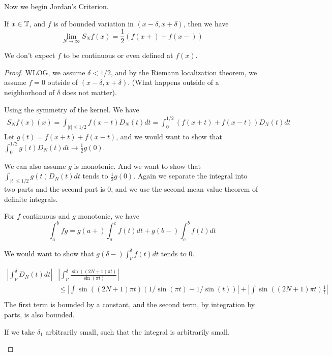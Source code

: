 Now we begin Jordan's Criterion.
\begin{theorem}
    If $x\in\mathbb{T}$, and $f$ is of bounded variation in $(x-\delta, x+\delta)$, then we have
    \begin{equation*}
        \lim_{N\to\infty}S_Nf(x)=\frac{1}{2}(f(x+)+f(x-))
    \end{equation*}
\end{theorem}
\begin{remark}
    We don't expect $f$ to be continuous or even defined at $f(x)$.
\end{remark}
\begin{proof}
    WLOG, we assume $\delta<1/2$, and by the Riemann localization theorem, we assume $f=0$ outside of $(x-\delta, x+\delta)$. (What happens outside of a neighborhood of $\delta$ does not matter).

    Using the symmetry of the kernel. We have
    \begin{align*}
        S_Nf(x)(x)=\int_{|t|\leq1/2}f(x-t)D_N(t)dt=\int_0^{1/2}(f(x+t)+f(x-t))D_N(t)dt
    \end{align*}
    Let $g(t)=f(x+t)+f(x-t)$, and we would want to show that $\int_0^{1/2}g(t)D_N(t)dt\to\frac{1}{2}g(0)$.

    We can also assume $g$ is monotonic. And we want to show that $\int_{|t|\leq1/2}g(t)D_N(t)dt$ tends to $\frac{1}{2}g(0)$. Again we separate the integral into two parts and the second part is 0, and we use the second mean value theorem of definite integrals.
    \begin{lemma}
        For $f$ continuous and $g$ monotonic, we have
        \begin{equation*}
            \int_a^bfg=g(a+)\int_a^c f(t)dt+g(b-)\int_c^bf(t)dt
        \end{equation*}
    \end{lemma}
    We would want to show that $g(\delta-)\int_\nu^\delta f(t)dt$ tends to 0.

    \begin{align*}
        \left|\int_\nu^\delta D_N(t)dt\right|&\left|\int_\nu^\delta \frac{\sin((2N+1)\pi t)}{\sin(\pi t)}\right|\\
        &\leq\left|\int\sin((2N+1)\pi t)(1/\sin(\pi t)-1/\sin(t))\right|+\left|\int\sin((2N+1)\pi t)\frac{1}{t} \right|\\
    \end{align*}
    The first term is bounded by a constant, and the second term, by integration by parts, is also bounded.

    \begin{remark}
        If we take $\delta_1$ arbitrarily small, such that the integral is arbitrarily small.
    \end{remark}
\end{proof}
